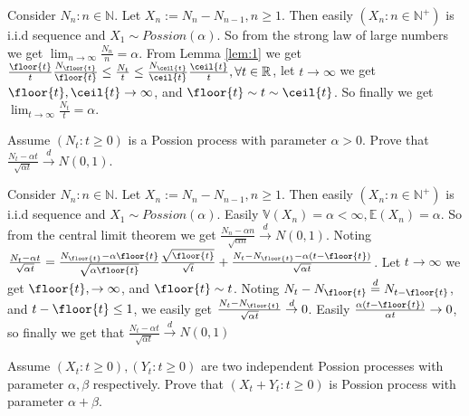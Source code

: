 \documentclass{ctexart}
\begin{document}
\begin{solution}
  Consider \(N_n:n \in \mathbb{N}\). Let \(X_n:=N_n-N_{n-1},n \geq 1\).
  Then easily \((X_n:n \in \mathbb{N}^+)\) is i.i.d sequence and \(X_1 \sim Possion(\alpha)\).
  So from the strong law of large numbers we get \(\lim_{n \to \infty}\frac{N_n}{n}=\alpha\).
  From Lemma \ref{lem:1} we get \(\frac{\floor{t}}{t} \frac{N_{\floor{t}}}{\floor{t}} \leq \frac{N_t}{t} \leq \frac{N_{\ceil{t}}}{\ceil{t}} \frac{\ceil{t}}{t}, \forall t \in \mathbb{R}\),
  let \(t \to \infty\) we get \(\floor{t},\ceil{t} \to \infty\), and \(\floor{t} \sim t \sim \ceil{t}\).
  So finally we get \(\lim_{t \to \infty} \frac{N_t}{t}=\alpha\).
\end{solution}
\begin{problem}\label{pro:3}
  Assume \((N_t:t \geq 0)\) is a Possion process with parameter \(\alpha>0\).
  Prove that \(\frac{N_t-\alpha t}{\sqrt{ \alpha t}} \overset{d}{\to} N(0,1)\).
\end{problem}
\begin{solution}
  Consider \(N_n:n \in \mathbb{N}\). Let \(X_n:=N_n-N_{n-1},n \geq 1\).
  Then easily \((X_n:n \in \mathbb{N}^+)\) is i.i.d sequence and \(X_1 \sim Possion(\alpha)\).
  Easily \(\mathbb{V}(X_n)=\alpha<\infty,\mathbb{E}(X_n)=\alpha\).
  So from the central limit theorem we get \( \frac{N_n-\alpha n}{\sqrt{ \alpha n}} \overset{d}{\to} N(0,1)\).
  Noting \(\frac{N_t - \alpha t}{\sqrt{ \alpha t}}=\frac{N_{\floor{t}}-\alpha \floor{t}}{\sqrt{ \alpha \floor{t}}} \frac{\sqrt{\floor{t}}}{\sqrt{t}} + \frac{N_t-N_{\floor{t}}-\alpha(t-\floor{t})}{\sqrt{\alpha t}}\).
  Let \(t \to \infty\) we get \(\floor{t}, \to \infty\), and \(\floor{t} \sim t\).
  Noting \(N_t-N_{\floor{t}}\overset{d}{=}N_{t-\floor{t}}\), and \(t - \floor{t} \leq 1\), we easily get \(\frac{N_t-N_{\floor{t}}}{\sqrt{ \alpha t}} \overset{d}{\to} 0\).
  Easily \(\frac{\alpha(t-\floor{t})}{\alpha t} \to 0\), so finally we get that
  \(\frac{N_t-\alpha t}{\sqrt{ \alpha t}} \overset{d}{\to} N(0,1)\)
\end{solution}
\begin{problem}\label{pro:4}
  Assume \((X_t:t \geq 0),(Y_t:t \geq 0)\) are two independent Possion processes with parameter \(\alpha,\beta\) respectively.
  Prove that \((X_t + Y_t:t \geq 0)\) is Possion process with parameter \(\alpha + \beta\).
\end{problem}
\end{document}
